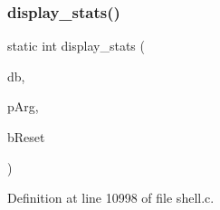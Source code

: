 \subsubsection{display\+\_\+stats()}
{\footnotesize\ttfamily static int display\+\_\+stats (\begin{DoxyParamCaption}\item[{\textbf{ sqlite3} $\ast$}]{db,  }\item[{\textbf{ Shell\+State} $\ast$}]{p\+Arg,  }\item[{int}]{b\+Reset }\end{DoxyParamCaption})\hspace{0.3cm}{\ttfamily [static]}}



Definition at line 10998 of file shell.\+c.



